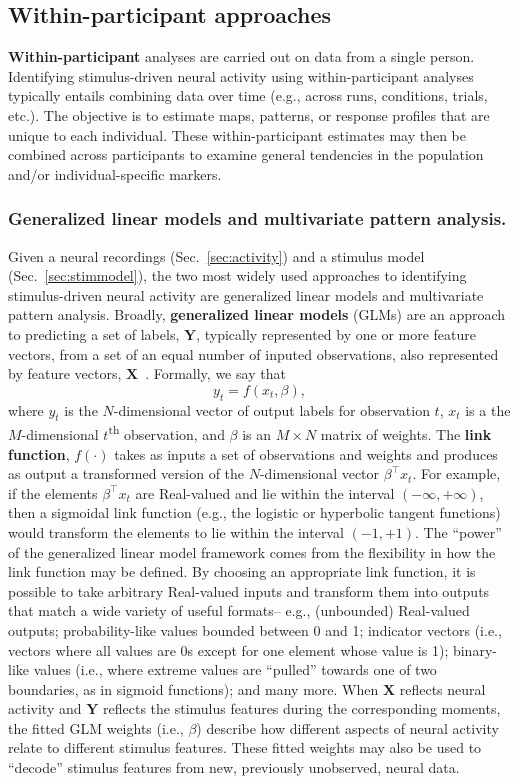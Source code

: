 \documentclass{llmxive}
\begin{document}
\subsection{Within-participant approaches}
\textbf{Within-participant} analyses are carried out on data from a
single person.  Identifying stimulus-driven neural activity using
within-participant analyses typically entails combining data over time
(e.g., across runs, conditions, trials, etc.).  The objective is to
estimate maps, patterns, or response profiles that are unique to each
individual.  These within-participant estimates may then be combined
across participants to examine general tendencies in the population and/or
individual-specific markers.

\subsubsection{Generalized linear models and multivariate pattern
  analysis.}

Given a neural recordings (Sec.~\ref{sec:activity}) and a stimulus
model (Sec.~\ref{sec:stimmodel}), the two most widely used approaches
to identifying stimulus-driven neural activity are generalized linear
models and multivariate pattern analysis.  Broadly,
\textbf{generalized linear models} (GLMs) are an approach to
predicting a set of labels, $\mathbf{Y}$, typically represented by one
or more feature vectors, from a set of an equal number of inputed
observations, also represented by feature vectors,
$\mathbf{X}$~\citep{NeldWedd72}.  Formally, we say that
\[
y_t = f\left(x_t, \beta\right),
\]
where $y_t$ is the $N$-dimensional vector of output labels for
observation $t$, $x_t$ is a the $M$-dimensional
$t$\textsuperscript{th} observation, and $\beta$ is an $M \times N$
matrix of weights.  The \textbf{link function}, $f(\cdot)$ takes as
inputs a set of observations and weights and produces as output a
transformed version of the $N$-dimensional vector $\beta^\top x_t$.
For example, if the elements $\beta^\top x_t$ are Real-valued and lie
within the interval $(-\infty, +\infty)$, then a sigmoidal link
function (e.g., the logistic or hyperbolic tangent functions) would
transform the elements to lie within the interval $(-1, +1)$.  The
``power'' of the generalized linear model framework comes from the
flexibility in how the link function may be defined.  By choosing an
appropriate link function, it is possible to take arbitrary
Real-valued inputs and transform them into outputs that match a wide
variety of useful formats-- e.g., (unbounded) Real-valued outputs;
probability-like values bounded between 0 and 1; indicator vectors
(i.e., vectors where all values are 0s except for one element whose
value is 1); binary-like values (i.e., where extreme values are
``pulled'' towards one of two boundaries, as in sigmoid functions);
and many more.  When $\mathbf{X}$ reflects neural activity and
$\mathbf{Y}$ reflects the stimulus features during the corresponding
moments, the fitted GLM weights (i.e., $\beta$) describe how different
aspects of neural activity relate to different stimulus features.
These fitted weights may also be used to ``decode'' stimulus features
from new, previously unobserved, neural data.
\end{document}
